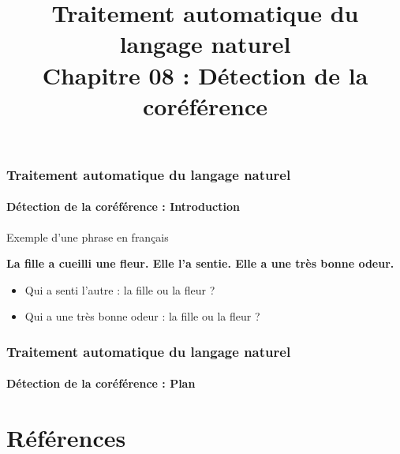\documentclass[xcolor=table]{beamer}
\title[TALN : 08- Détection de la coréférence]%
{Traitement automatique du langage naturel\\Chapitre 08 : Détection de la coréférence}
\begin{document}
	
\begin{frame}
\frametitle{Traitement automatique du langage naturel}
\framesubtitle{Détection de la coréférence : Introduction}

\begin{exampleblock}{Exemple d'une phrase en français}
	\begin{center}
		\Large\bfseries
	La fille a cueilli une fleur. Elle l'a sentie. Elle a une très bonne odeur.
	\end{center}
\end{exampleblock}

\begin{itemize}
	\item Qui a senti l'autre : la fille ou la fleur ?
	\item Qui a une très bonne odeur : la fille ou la fleur ?
\end{itemize}

\end{frame}

%
%

\begin{frame}
\frametitle{Traitement automatique du langage naturel}
\framesubtitle{Détection de la coréférence : Plan}

\begin{multicols}{2}
\tableofcontents
\end{multicols}
\end{frame}

\section{Références}
\end{document}
